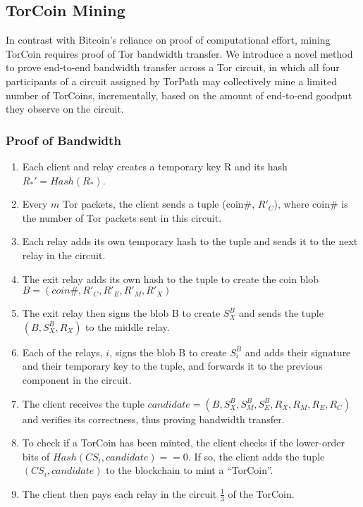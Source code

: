 \subsection{TorCoin Mining}

In contrast with Bitcoin's reliance on proof of computational effort,
mining TorCoin requires proof of Tor bandwidth transfer.
We introduce a novel method to
prove end-to-end bandwidth transfer across a Tor circuit,
in which all four participants of a circuit assigned by TorPath
may collectively mine a limited number of TorCoins, incrementally,
based on the amount of end-to-end goodput they observe on the circuit.



\subsubsection{Proof of Bandwidth}
\begin{enumerate}
\item
Each client and relay creates a temporary key R and its hash $R_*' = Hash(R_*)$. 

\item
Every $m$ Tor packets, the client sends a tuple (coin\#, $R'_C$), where 
coin\# is the number of Tor packets sent in this circuit.

\item
Each relay adds its own temporary hash to the tuple and sends it to the next
relay in the circuit.

\item
The exit relay adds its own hash to the tuple to create the coin blob 
$B = (coin\#, R'_{C}, R'_{E}, R'_{M}, R'_{X})$ 

\item
The exit relay then signs the blob B to create $S^B_X$ and sends the 
tuple $(B, S^B_X, R_X)$ to the middle relay.

\item
Each of the relays, $i$, signs the blob B to create $S^B_i$ and adds their 
signature and their temporary key to the tuple, and forwards it to the previous 
component in the circuit. 

\item
The client receives the tuple $candidate = (B, S^B_X, S^B_M, S^B_E, R_X, R_M,
R_E, R_C)$ and verifies its correctness, thus proving bandwidth transfer.

\item
To check if a TorCoin has been minted, the client checks if the lower-order
bits of $Hash(CS_i, candidate) == 0$. If so, the client adds the tuple
$(CS_i, candidate)$ to the blockchain to mint a ``TorCoin''.

\item
The client then pays each relay in the circuit $\frac{1}{3}$ of the TorCoin. 
\end{enumerate}

